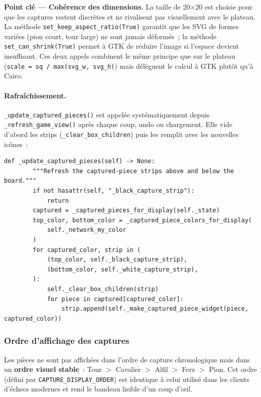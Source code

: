 \documentclass[a4paper,11pt]{article}
\begin{document}
\textbf{Point clé --- Cohérence des dimensions.}
La taille de 20×20 est choisie pour que les captures restent discrètes
et ne rivalisent pas visuellement avec le plateau. La méthode
\texttt{set\_keep\_aspect\_ratio(True)} garantit que les SVG de formes
variées (pion court, tour large) ne sont jamais déformés~; la méthode
\texttt{set\_can\_shrink(True)} permet à GTK de réduire l'image si l'espace
devient insuffisant. Ces deux appels combinent le même principe que sur le
plateau (\texttt{scale = sq / max(svg\_w, svg\_h)}) mais délèguent le calcul
à GTK plutôt qu'à Cairo.

\paragraph{Rafraîchissement.}
\texttt{\_update\_captured\_pieces()} est appelée systématiquement depuis
\texttt{\_refresh\_game\_view()} après chaque coup, undo ou chargement.
Elle vide d'abord les strips (\texttt{\_clear\_box\_children}) puis les
remplit avec les nouvelles icônes~:

\begin{verbatim}
def _update_captured_pieces(self) -> None:
        """Refresh the captured-piece strips above and below the board."""
        if not hasattr(self, "_black_capture_strip"):
            return
        captured = _captured_pieces_for_display(self._state)
        top_color, bottom_color = _captured_piece_colors_for_display(
            self._network_my_color
        )
        for captured_color, strip in (
            (top_color, self._black_capture_strip),
            (bottom_color, self._white_capture_strip),
        ):
            self._clear_box_children(strip)
            for piece in captured[captured_color]:
                strip.append(self._make_captured_piece_widget(piece, captured_color))
\end{verbatim}

\subsubsection{Ordre d'affichage des captures}

Les pièces ne sont pas affichées dans l'ordre de capture chronologique mais
dans un \textbf{ordre visuel stable}~: Tour $>$ Cavalier $>$ Alfil $>$
Ferz $>$ Pion. Cet ordre (défini par \texttt{CAPTURE\_DISPLAY\_ORDER}) est
identique à celui utilisé dans les clients d'échecs modernes et rend le bandeau
lisible d'un coup d'œil.
\end{document}
